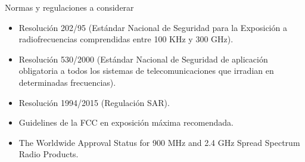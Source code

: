 Normas y regulaciones a considerar

\begin{itemize}
\item Resolución 202/95  (Estándar Nacional de Seguridad para la Exposición a radiofrecuencias comprendidas entre 100 KHz y 300 GHz).
\item Resolución 530/2000 (Estándar Nacional de Seguridad de aplicación obligatoria a todos los sistemas de telecomunicaciones que irradian en determinadas frecuencias).
\item Resolución 1994/2015 (Regulación SAR).
\item Guidelines de la FCC en exposición máxima recomendada.
\item The Worldwide Approval Status for 900 MHz and 2.4 GHz Spread
Spectrum Radio Products.
\end{itemize}









